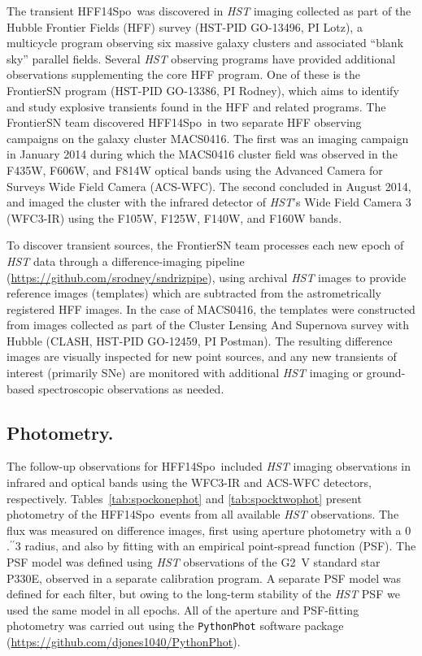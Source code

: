 \documentclass{article}
\providecommand\citep{\cite}
\providecommand\citet{\cite}
\def\farcs{\mbox{\ensuremath{.\!\!^{\prime\prime}}}}
\def\HST{{\it HST}\xspace}
\def\spock{HFF14Spo\xspace}
\def\MACS0416{MACS0416\xspace}
\begin{document}
The transient \spock\ was discovered in \HST imaging collected as part
of the Hubble Frontier Fields (HFF) survey (HST-PID GO-13496, PI Lotz),
a multicycle program observing six massive galaxy clusters and
associated ``blank sky'' parallel fields\cite{Lotz:2017}.  Several
\HST observing programs have provided additional observations
supplementing the core HFF program.  One of these is the FrontierSN
program (HST-PID GO-13386, PI Rodney), which aims to identify and study
explosive transients found in the HFF and related
programs\citet{Rodney:2015a}.  The FrontierSN team discovered
\spock\ in two separate HFF observing campaigns on the galaxy cluster
\MACS0416.  The first was an imaging campaign in January 2014 during
which the MACS0416 cluster field was observed in the F435W, F606W, and
F814W optical bands using the Advanced Camera for Surveys Wide Field
Camera (ACS-WFC).  The second concluded in August 2014, and imaged
the cluster with the infrared detector of \HST's Wide Field Camera 3
(WFC3-IR) using the F105W, F125W, F140W, and F160W bands.

To discover transient sources, the FrontierSN team processes each new
epoch of \HST data through a difference-imaging
pipeline (\url{https://github.com/srodney/sndrizpipe}), using
archival \HST images to provide reference images (templates) which are
subtracted from the astrometrically registered HFF images. In the case
of MACS0416, the templates were constructed from images collected as
part of the Cluster Lensing And Supernova survey with Hubble (CLASH,
HST-PID GO-12459, PI Postman)\cite{Postman:2012}. The resulting 
difference images are
visually inspected for new point sources, and any new transients of
interest (primarily SNe) are monitored with additional
\HST imaging or ground-based spectroscopic observations as needed.


\subsection{Photometry.}\label{sec:Photometry}


The follow-up observations for \spock\ included \HST imaging
observations in infrared and optical bands using the WFC3-IR and
ACS-WFC detectors, respectively. Tables~\ref{tab:spockonephot} and
\ref{tab:spocktwophot} present photometry of the \spock\ events from
all available \HST observations. The flux was measured on difference
images, first using aperture photometry with a 0\farcs3 radius, and
also by fitting with an empirical point-spread function (PSF).  The
PSF model was defined using \HST observations of the G2~V standard star
P330E, observed in a separate calibration program.  A separate PSF
model was defined for each filter, but owing to the long-term
stability of the \HST PSF we used the same model in all epochs.  All
of the aperture and PSF-fitting photometry was carried out using the
{\tt PythonPhot} software package
(\url{https://github.com/djones1040/PythonPhot})\citep{Jones:2015}.
\end{document}
